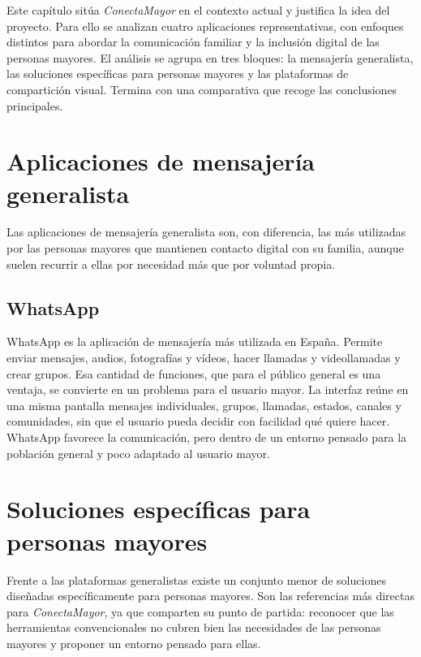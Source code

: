
Este capítulo sitúa \emph{ConectaMayor} en el contexto actual y justifica
la idea del proyecto. Para ello se analizan cuatro aplicaciones
representativas, con enfoques distintos para abordar la comunicación
familiar y la inclusión digital de las personas mayores. El análisis se
agrupa en tres bloques: la mensajería generalista, las soluciones
específicas para personas mayores y las plataformas de compartición
visual. Termina con una comparativa que recoge las conclusiones
principales.


\section{Aplicaciones de mensajería generalista\label{SEC:EA_GENERALISTAS}}

Las aplicaciones de mensajería generalista son, con diferencia, las más
utilizadas por las personas mayores que mantienen contacto digital con su
familia, aunque suelen recurrir a ellas por necesidad más que por voluntad propia.

\subsection{WhatsApp}

WhatsApp \cite{whatsapp} es la aplicación de mensajería más utilizada en
España. Permite enviar mensajes, audios, fotografías y vídeos, hacer
llamadas y videollamadas y crear grupos. Esa cantidad de funciones, que
para el público general es una ventaja, se convierte en un problema para
el usuario mayor. La interfaz reúne en una misma pantalla mensajes
individuales, grupos, llamadas, estados, canales y comunidades, sin que el
usuario pueda decidir con facilidad qué quiere hacer. WhatsApp
favorece la comunicación, pero dentro de un entorno pensado para la
población general y poco adaptado al usuario mayor.


\section{Soluciones específicas para personas mayores\label{SEC:EA_ESPECIFICAS}}

Frente a las plataformas generalistas existe un conjunto menor de
soluciones diseñadas específicamente para personas mayores. Son las
referencias más directas para \emph{ConectaMayor}, ya que comparten su
punto de partida: reconocer que las herramientas convencionales no cubren
bien las necesidades de las personas mayores y proponer un entorno pensado para ellas.

